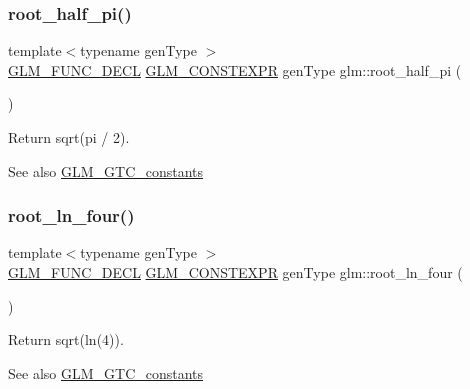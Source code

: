 \subsubsection{\texorpdfstring{root\+\_\+half\+\_\+pi()}{root\_half\_pi()}}
{\footnotesize\ttfamily template$<$typename gen\+Type $>$ \\
\hyperlink{setup_8hpp_ab2d052de21a70539923e9bcbf6e83a51}{G\+L\+M\+\_\+\+F\+U\+N\+C\+\_\+\+D\+E\+CL} \hyperlink{setup_8hpp_a08b807947b47031d3a511f03f89645ad}{G\+L\+M\+\_\+\+C\+O\+N\+S\+T\+E\+X\+PR} gen\+Type glm\+::root\+\_\+half\+\_\+pi (\begin{DoxyParamCaption}{ }\end{DoxyParamCaption})}

Return sqrt(pi / 2). \begin{DoxySeeAlso}{See also}
\hyperlink{group__gtc__constants}{G\+L\+M\+\_\+\+G\+T\+C\+\_\+constants} 
\end{DoxySeeAlso}
\mbox{\label{group__gtc__constants_ga4129412e96b33707a77c1a07652e23e2}} 
\subsubsection{\texorpdfstring{root\+\_\+ln\+\_\+four()}{root\_ln\_four()}}
{\footnotesize\ttfamily template$<$typename gen\+Type $>$ \\
\hyperlink{setup_8hpp_ab2d052de21a70539923e9bcbf6e83a51}{G\+L\+M\+\_\+\+F\+U\+N\+C\+\_\+\+D\+E\+CL} \hyperlink{setup_8hpp_a08b807947b47031d3a511f03f89645ad}{G\+L\+M\+\_\+\+C\+O\+N\+S\+T\+E\+X\+PR} gen\+Type glm\+::root\+\_\+ln\+\_\+four (\begin{DoxyParamCaption}{ }\end{DoxyParamCaption})}

Return sqrt(ln(4)). \begin{DoxySeeAlso}{See also}
\hyperlink{group__gtc__constants}{G\+L\+M\+\_\+\+G\+T\+C\+\_\+constants} 
\end{DoxySeeAlso}
\mbox{\label{group__gtc__constants_ga261380796b2cd496f68d2cf1d08b8eb9}} 
